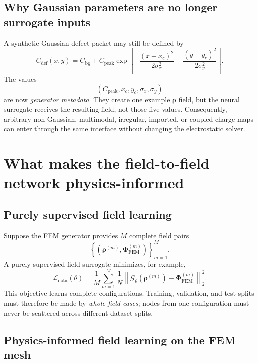 \documentclass[11pt]{article}
\newcommand{\Ldata}{\mathcal{L}_{\mathrm{data}}}
\begin{document}
\subsection{Why Gaussian parameters are no longer surrogate inputs}

A synthetic Gaussian defect packet may still be defined by
\begin{equation}
C_{\mathrm{def}}(x,y)=C_{\mathrm{bg}}+C_{\mathrm{peak}}
\exp\left[-\frac{(x-x_c)^2}{2\sigma_x^2}-\frac{(y-y_c)^2}{2\sigma_y^2}\right].
\end{equation}
The values
\begin{equation}
(C_{\mathrm{peak}},x_c,y_c,\sigma_x,\sigma_y)
\end{equation}
are now \emph{generator metadata}. They create one example $\bm{\rho}$ field, but the neural surrogate receives the resulting field, not those five values. Consequently, arbitrary non-Gaussian, multimodal, irregular, imported, or coupled charge maps can enter through the same interface without changing the electrostatic solver.

\section{What makes the field-to-field network physics-informed}

\subsection{Purely supervised field learning}

Suppose the FEM generator provides $M$ complete field pairs
\begin{equation}
\left\{\left(\bm{\rho}^{(m)},\bm{\Phi}_{\mathrm{FEM}}^{(m)}\right)\right\}_{m=1}^{M}.
\end{equation}
A purely supervised field surrogate minimizes, for example,
\begin{equation}
\Ldata(\theta)=\frac{1}{M}\sum_{m=1}^{M}
\frac{1}{N}\left\|
\mathcal{G}_{\theta}\!\left(\bm{\rho}^{(m)}\right)-
\bm{\Phi}_{\mathrm{FEM}}^{(m)}
\right\|_2^2.
\label{eq:data_loss_field}
\end{equation}
This objective learns complete configurations. Training, validation, and test splits must therefore be made by \emph{whole field cases}; nodes from one configuration must never be scattered across different dataset splits.

\subsection{Physics-informed field learning on the FEM mesh}
\end{document}
